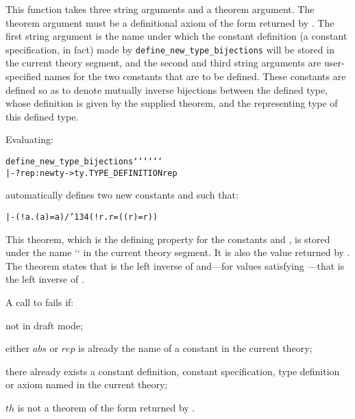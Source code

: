 \noindent This function takes three string arguments and a theorem argument.
The theorem argument must be a definitional axiom of the form returned by
.  The first string argument is the name under which
the constant definition (a constant specification, in fact) made by
{\small\verb!define_new_type_bijections!} will be stored in the current theory
segment, and the second and third string arguments are user-specified names for
the two constants that are to be defined. These constants are defined so as to
denote mutually inverse bijections between the defined type, whose definition
is given by the supplied theorem, and the representing type of this defined
type.

Evaluating:

\medskip
{\def\op{{\normalsize\sl op}}
\begin{hol}\begin{alltt}
   define\_new\_type\_bijections `` `` ``
           |- ?rep:newty->ty. TYPE\_DEFINITION  rep
\end{alltt}\end{hol}}

\medskip

\noindent automatically defines two new constants
 and 
such that:

{\def\bk{\char'134}
\begin{hol}\begin{alltt}
   |- (!a. ( a) = a) /\bk (!r.  r = (( r) = r))
\end{alltt}\end{hol}}

\noindent This theorem, which is the defining property for the constants
 and , is stored under the name `` in the current theory
segment.  It is also the value returned by .
The theorem states that  is the left inverse of  and---for
values satisfying ---that  is the left inverse of .

A call to
fails if:

\begin{myenumerate}
\item not in draft mode;
\item either $abs$ or $rep$ is already the name of a constant in
the current theory;
\item there already exists a constant definition, constant specification,
type definition or axiom named   in the current theory;
\item $th$ is not a theorem of the form returned by
.
\end{myenumerate}%

